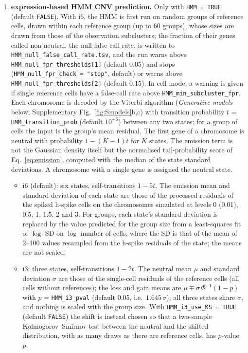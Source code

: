 \begin{enumerate}
\item[\textbf{19}] \textbf{expression-based HMM CNV prediction.} Only with \texttt{HMM\ =\ TRUE} (default \texttt{FALSE}). With i6, the HMM is first run on random groups of reference cells, drawn within each reference group (up to 60 groups), whose sizes are drawn from those of the observation subclusters; the fraction of their genes called non-neutral, the null false-call rate, is written to \texttt{HMM\_null\_false\_call\_rate.tsv}, and the run warns above \texttt{HMM\_null\_fpr\_thresholds[1]} (default 0.05) and stops (\texttt{HMM\_null\_fpr\_check\ =\ "stop"}, default) or warns above \texttt{HMM\_null\_fpr\_thresholds[2]} (default 0.15). In cell mode, a warning is given if single reference cells have a false-call rate above \texttt{HMM\_min\_subcluster\_fpr}. Each chromosome is decoded by the Viterbi algorithm (\emph{Generative models} below; Supplementary Fig.~\ref{fig:Smodels}b,c) with transition probability $t$ = \texttt{HMM\_transition\_prob} (default $10^{-6}$) between any two states; for a group of cells the input is the group's mean residual. The first gene of a chromosome is neutral with probability $1-(K-1)t$ for $K$ states. The emission term is not the Gaussian density itself but the normalised tail-probability score of Eq.~\ref{eq:emission}, computed with the median of the state standard deviations. A chromosome with a single gene is assigned the neutral state.
\begin{itemize}
\tightlist
\item i6 (default): six states, self-transitions $1-5t$. The emission mean and standard deviation of each state are those of the processed residuals of the spiked h-spike cells on the chromosomes simulated at levels 0 (0.01), 0.5, 1, 1.5, 2 and 3. For groups, each state's standard deviation is replaced by the value predicted for the group size from a least-squares fit of $\log$ SD on $\log$ number of cells, where the SD is that of the mean of 2--100 values resampled from the h-spike residuals of the state; the means are not scaled.
\item i3: three states, self-transitions $1-2t$. The neutral mean $\mu$ and standard deviation $\sigma$ are those of the single-cell residuals of the reference cells (all cells without references); the loss and gain means are $\mu \mp \sigma\,\Phi^{-1}(1-p)$ with $p$ = \texttt{HMM\_i3\_pval} (default 0.05, i.e.\ $1.645\,\sigma$); all three states share $\sigma$, and nothing is scaled with the group size. With \texttt{HMM\_i3\_use\_KS\ =\ TRUE} (default \texttt{FALSE}) the shift is instead chosen so that a two-sample Kolmogorov--Smirnov test between the neutral and the shifted distribution, with as many draws as there are reference cells, has $p$-value $p$.

\end{itemize}
\end{enumerate}
